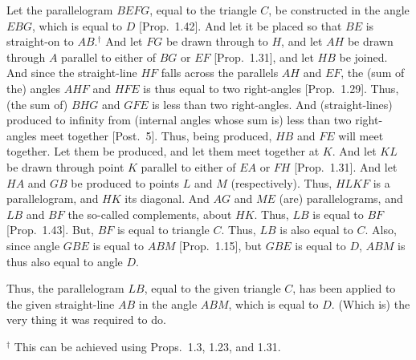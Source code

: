 \begin{Parallel}{}{}
{\epsfysize=2.7in
\centerline{}

Let the parallelogram $BEFG$, equal to the triangle $C$, be
constructed in the angle $EBG$, which is equal to $D$ [Prop.~1.42].
And let it be placed so that $BE$ is straight-on to $AB$.$^\dag$  And
let $FG$ be drawn through to $H$, and let $AH$ be
drawn through $A$ parallel to either of $BG$ or $EF$ [Prop.~1.31], and
let $HB$ be joined. And since the straight-line $HF$ falls across the
parallels $AH$ and $EF$, the (sum of the) angles $AHF$ and $HFE$ is thus equal to
two right-angles [Prop.~1.29]. Thus, (the sum of) $BHG$ and $GFE$ is less than two
right-angles.
And (straight-lines) produced to
infinity from (internal angles whose sum is) less than two right-angles meet together [Post.~5].
Thus, being produced, $HB$ and $FE$ will meet together. Let them 
be produced, and let them meet together at $K$. And let $KL$ be
drawn through point $K$ parallel to either of $EA$ or $FH$ [Prop.~1.31]. And
let $HA$ and $GB$ be produced to points $L$ and $M$ (respectively). Thus, $HLKF$ is a parallelogram, and $HK$ its diagonal. And $AG$ and $ME$ (are) parallelograms, and $LB$ and $BF$ the so-called complements, about $HK$. Thus, $LB$ is
equal to $BF$ [Prop.~1.43]. But, $BF$ is equal to triangle $C$. Thus, $LB$ is also
equal to $C$. Also, since angle $GBE$ is equal to $ABM$ [Prop.~1.15], but
$GBE$ is equal to $D$, $ABM$ is thus also equal to angle $D$.

Thus, the parallelogram $LB$, equal to the
given triangle $C$, has been applied to the given straight-line
$AB$ in the angle $ABM$, which is equal to $D$. (Which is) the very thing it was required to do.}
\end{Parallel}
{\footnotesize \noindent$^\dag$ This can be achieved using Props.~1.3, 1.23, and 1.31.}

